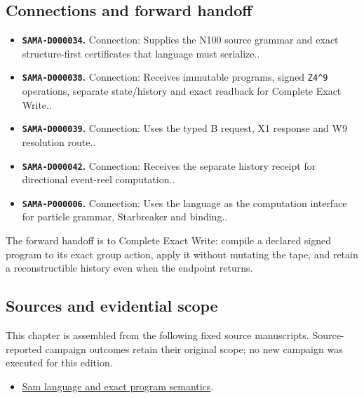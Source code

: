 \subsection{Connections and forward
handoff}\label{viii-ch02-connections-and-forward-handoff}

\begin{itemize}
\tightlist
\item
  \textbf{\texttt{SAMA-D000034}.} Connection: Supplies the N100 source
  grammar and exact structure-first certificates that language must
  serialize..
\item
  \textbf{\texttt{SAMA-D000038}.} Connection: Receives immutable
  programs, signed \texttt{Z4\^{}9} operations, separate state/history
  and exact readback for Complete Exact Write..
\item
  \textbf{\texttt{SAMA-D000039}.} Connection: Uses the typed B request,
  X1 response and W9 resolution route..
\item
  \textbf{\texttt{SAMA-D000042}.} Connection: Receives the separate
  history receipt for directional event-reel computation..
\item
  \textbf{\texttt{SAMA-P000006}.} Connection: Uses the language as the
  computation interface for particle grammar, Starbreaker and binding..
\end{itemize}

The forward handoff is to Complete Exact Write: compile a declared
signed program to its exact group action, apply it without mutating the
tape, and retain a reconstructible history even when the endpoint
returns.

\subsection{Sources and evidential
scope}\label{viii-ch02-sources-and-evidential-scope}

This chapter is assembled from the following fixed source manuscripts.
Source-reported campaign outcomes retain their original scope; no new
campaign was executed for this edition.

\begin{itemize}
\tightlist
\item
  \href{https://github.com/iwtbotiwtwot/SAMA/blob/4c2b5dc1649da5900c90b90d0ce56c223dbb7717/vol_iii/01-grammar-and-language/sam-language-and-exact-program-semantics.md}{Sam
  language and exact program semantics}.
\end{itemize}
